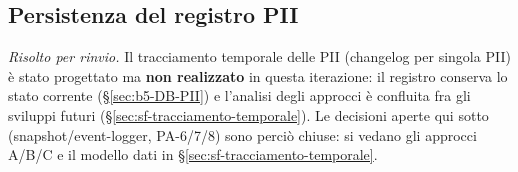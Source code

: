 \subsection{Persistenza del registro PII}
\label{sub:pa-persistenza}

\emph{Risolto per rinvio.} Il tracciamento temporale delle PII (changelog per singola PII) è stato progettato ma \textbf{non realizzato} in questa iterazione: il registro conserva lo stato corrente (§\ref{sec:b5-DB-PII}) e l'analisi degli approcci è confluita fra gli sviluppi futuri (§\ref{sec:sf-tracciamento-temporale}). Le decisioni aperte qui sotto (snapshot/event-logger, PA-6/7/8) sono perciò chiuse: si vedano gli approcci A/B/C e il modello dati in §\ref{sec:sf-tracciamento-temporale}.

%
%
%

